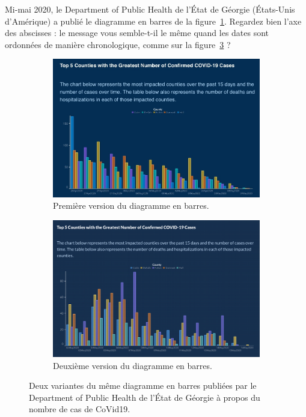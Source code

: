Mi-mai 2020, le Department of Public Health de l'État de Géorgie (États-Unis
d'Amérique) a publié le diagramme en barres de la
figure~\ref{fig:georgia_wtf_barplot}. Regardez bien l'axe des abscisses : le
message vous semble-t-il le même quand les dates sont ordonnées de manière
chronologique, comme sur la figure~\ref{fig:georgia_fixed_barplot} ?

\begin{figure}[h]
  \centering
  \begin{subfigure}[t]{0.47\textwidth}
    \centering
    \includegraphics[width=\textwidth]{figures/pratiques/georgia_wtf_barplot}
    \caption{Première version du diagramme en barres.}
    \label{fig:georgia_wtf_barplot}
  \end{subfigure} \hfill
  \begin{subfigure}[t]{0.47\textwidth}
    \includegraphics[width=\textwidth]{figures/pratiques/georgia_fixed_barplot}  
    \caption{Deuxième version du diagramme en barres.}
    \label{fig:georgia_fixed_barplot}
  \end{subfigure}  
  \caption{Deux variantes du même diagramme en barres publiées par le
    Department of Public Health de l'État de Géorgie à propos du nombre de cas
    de CoVid19.}
\end{figure}

